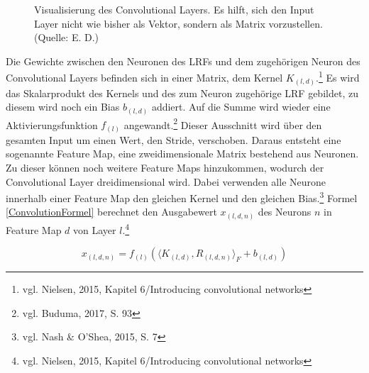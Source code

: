 \documentclass[
	a4paper,
	12pt,
	ngerman,
	oneside
]{scrreprt}											%
\newcommand{\fundamentals}[1]{vgl. Buduma, 2017, S. {#1}}
\newcommand{\cnnKlein}[1]{vgl. Nash \& O'Shea, 2015, S. {#1}}
\begin{document}
\begin{figure}
					\caption{Visualisierung des Convolutional Layers. Es hilft, sich den Input Layer nicht wie bisher als Vektor, sondern als Matrix vorzustellen. (Quelle: E. D.)}\label{LRF}
				\end{figure}
				
				Die Gewichte zwischen den Neuronen des LRFs und dem zugehörigen Neuron des Convolutional Layers befinden sich in einer Matrix, dem Kernel $K_{(l,d)}$.\footnote{vgl. Nielsen, 2015, Kapitel 6/Introducing convolutional networks} Es wird das Skalarprodukt des Kernels und des zum Neuron zugehörige LRF gebildet, zu diesem wird noch ein Bias $b_{(l,d)}$ addiert. Auf die Summe wird wieder eine Aktivierungsfunktion $f_{(l)}$ angewandt.\footnote{\fundamentals{93}} Dieser Ausschnitt wird über den gesamten Input um einen Wert, den Stride, verschoben. Daraus entsteht eine sogenannte Feature Map, eine zweidimensionale Matrix bestehend aus Neuronen. Zu dieser können noch weitere Feature Maps hinzukommen, wodurch der Convolutional Layer dreidimensional wird. Dabei verwenden alle Neurone innerhalb einer Feature Map den gleichen Kernel und den gleichen Bias.\footnote{\cnnKlein{7}} Formel \ref{ConvolutionFormel} berechnet den Ausgabewert $x_{(l,d,n)}$ des Neurons $n$ in Feature Map $d$ von Layer $l$.\footnote{vgl. Nielsen, 2015, Kapitel 6/Introducing convolutional networks}
		
				\begin{equation}\label{ConvolutionFormel}
					x_{(l,d,n)} = f_{(l)} \left( \langle K_{(l,d)},R_{(l,d,n)} \rangle_F + b_{(l,d)} \right)
				\end{equation}
		
\end{document}
